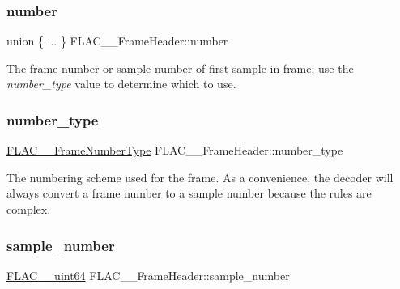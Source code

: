 \subsubsection{\texorpdfstring{number}{number}}
{\footnotesize\ttfamily union \{ ... \}   F\+L\+A\+C\+\_\+\+\_\+\+Frame\+Header\+::number}

The frame number or sample number of first sample in frame; use the {\itshape number\+\_\+type} value to determine which to use. \mbox{\label{struct_f_l_a_c_____frame_header_a7a62ec09e6f3029297179ef65377265f}} 
\subsubsection{\texorpdfstring{number\+\_\+type}{number\_type}}
{\footnotesize\ttfamily \hyperlink{group__flac__format_ga8fe9ebc78386cd2a3d23b7b8e3818e1c}{F\+L\+A\+C\+\_\+\+\_\+\+Frame\+Number\+Type} F\+L\+A\+C\+\_\+\+\_\+\+Frame\+Header\+::number\+\_\+type}

The numbering scheme used for the frame. As a convenience, the decoder will always convert a frame number to a sample number because the rules are complex. \mbox{\label{struct_f_l_a_c_____frame_header_a4bbe555be68bd9fa48a22624233ee9f0}} 
\subsubsection{\texorpdfstring{sample\+\_\+number}{sample\_number}}
{\footnotesize\ttfamily \hyperlink{ordinals_8h_aa78c8c70a3eb8a58af7436f278acde8e}{F\+L\+A\+C\+\_\+\+\_\+uint64} F\+L\+A\+C\+\_\+\+\_\+\+Frame\+Header\+::sample\+\_\+number}

\mbox{\label{struct_f_l_a_c_____frame_header_acc23daa576f4e75885bf4f2b69cee1be}} 
